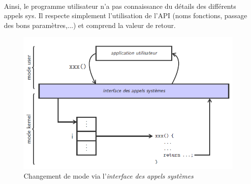 {\paragraph{}
Ainsi, le programme utilisateur n'a pas connaissance du détails des différents appels sys. Il respecte simplement l'utilisation de l'API (noms fonctions, passage des bons paramètres,...) et comprend la valeur de retour.
\begin{figure}[h!]
\center\includegraphics[scale=.5]{images/execution-appel-systeme}
\caption{Changement de mode via l'\textit{interface des appels systèmes} \cite{ref1}}
\end{figure}
}


